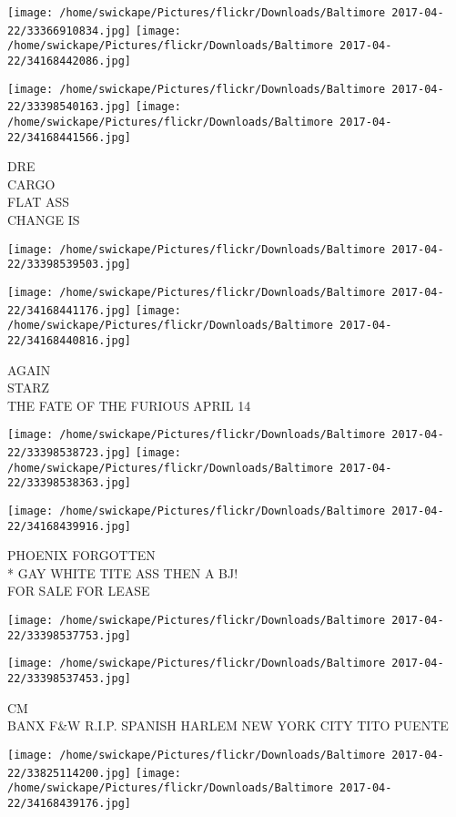 \documentclass[10pt,letterpaper]{article}
\begin{document}
\texttt{[image: /home/swickape/Pictures/flickr/Downloads/Baltimore 2017-04-22/33366910834.jpg]}
\texttt{[image: /home/swickape/Pictures/flickr/Downloads/Baltimore 2017-04-22/34168442086.jpg]}

\texttt{[image: /home/swickape/Pictures/flickr/Downloads/Baltimore 2017-04-22/33398540163.jpg]}
\texttt{[image: /home/swickape/Pictures/flickr/Downloads/Baltimore 2017-04-22/34168441566.jpg]}

DRE\\
CARGO\\
FLAT ASS\\
CHANGE IS
\pagebreak

\texttt{[image: /home/swickape/Pictures/flickr/Downloads/Baltimore 2017-04-22/33398539503.jpg]}

\vspace{0.25in}
\texttt{[image: /home/swickape/Pictures/flickr/Downloads/Baltimore 2017-04-22/34168441176.jpg]}
\texttt{[image: /home/swickape/Pictures/flickr/Downloads/Baltimore 2017-04-22/34168440816.jpg]}

AGAIN\\
STARZ\\
THE FATE OF THE FURIOUS APRIL 14
\pagebreak

\texttt{[image: /home/swickape/Pictures/flickr/Downloads/Baltimore 2017-04-22/33398538723.jpg]}
\texttt{[image: /home/swickape/Pictures/flickr/Downloads/Baltimore 2017-04-22/33398538363.jpg]}

\texttt{[image: /home/swickape/Pictures/flickr/Downloads/Baltimore 2017-04-22/34168439916.jpg]}

PHOENIX FORGOTTEN\\
* GAY WHITE TITE ASS THEN A BJ!\\
FOR SALE FOR LEASE
\pagebreak

\texttt{[image: /home/swickape/Pictures/flickr/Downloads/Baltimore 2017-04-22/33398537753.jpg]}

\vspace{0.25in}
\texttt{[image: /home/swickape/Pictures/flickr/Downloads/Baltimore 2017-04-22/33398537453.jpg]}

CM\\
BANX F\&W R.I.P. SPANISH HARLEM NEW YORK CITY TITO PUENTE
\pagebreak

\texttt{[image: /home/swickape/Pictures/flickr/Downloads/Baltimore 2017-04-22/33825114200.jpg]}
\texttt{[image: /home/swickape/Pictures/flickr/Downloads/Baltimore 2017-04-22/34168439176.jpg]}
\end{document}
